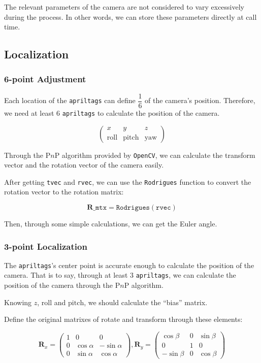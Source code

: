 \documentclass{article}
\begin{document}
The relevant parameters of the camera are not considered to vary excessively during the process. In other words, we can store these parameters directly at call time.

\subsection{Localization}

\subsubsection{6-point Adjustment}
Each location of the \texttt{apriltags} can define $\dfrac16$ of the camera's position. Therefore, we need at least $6$ \texttt{apriltags} to calculate the position of the camera.

\[
  \left(
    \begin{matrix}
      x&y&z\\
      \mathrm{roll}&\mathrm{pitch}&\mathrm{yaw}
    \end{matrix}
  \right)
\]

Through the P$n$P algorithm provided by \texttt{OpenCV}, we can calculate the transform vector and the rotation vector of the camera easily.

After getting \texttt{tvec} and \texttt{rvec}, we can use the \texttt{Rodrigues} function to convert the rotation vector to the rotation matrix:

\[
  \boldsymbol{R}\_\texttt{mtx}=\texttt{Rodrigues}\left(\texttt{rvec}\right)
\]

Then, through some simple calculations, we can get the Euler angle.

\subsubsection{3-point Localization}
The \texttt{apriltags}'s center point is accurate enough to calculate the position of the camera. That is to say, through at least $3$ \texttt{apriltags}, we can calculate the position of the camera through the P$n$P algorithm.

Knowing $z$, $\mathrm{roll}$ and $\mathrm{pitch}$, we should calculate the ``bias'' matrix.

Define the original matrixes of rotate and transform through these elements:

\begin{equation}
  \boldsymbol{R}_x=
  \left(
    \begin{matrix}
      1 & 0 & 0 \\
      0 & \cos\alpha & -\sin\alpha \\
      0 & \sin\alpha & \cos\alpha
    \end{matrix}
  \right),
  \boldsymbol{R}_y=
  \left(
    \begin{matrix}
      \cos\beta & 0 & \sin\beta \\
      0 & 1 & 0 \\
      -\sin\beta & 0 & \cos\beta
    \end{matrix}
  \right)
\end{equation}
\end{document}
